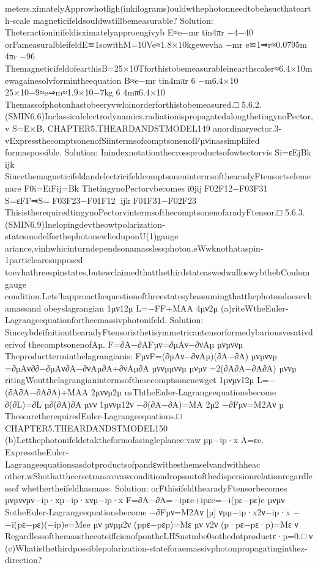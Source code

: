 {{{{{{{{{{meters.ximatelyApprowhotligh(inkilograms)ouldwthephotonneedtobehsucthatearth-scale
magneticifeldsouldwstillbemeasurable?
Solution:
Theteractioninifeldisximatelyapproengivyb
E≈e−mr
tin4πr
−4−40
orFameasuralbleifeldE≊1sowithM=10Ve≈1.8×10kgewevha
−mr
e≊1⇒r≈0.0795m
4πr
−96
ThemagneticifeldofearthisB=25×10Tforthistobemeasurableinearthscaler≈6.4×10m
ewagainesolvformintheequation
B≈e−mr
tin4mπr
6
−m6.4×10
25×10−9≈e⇒m≈1.9×10−7kg
6
4mπ6.4×10
Themassofphotonhastobeeryvwloinorderforthistobemeasured.□
5.6.2.(SMIN6.6)Inclassicalelectrodynamics,radiationispropagatedalongthetingynoPector,v
S=E×B,
CHAPTER5.THEARDANDSTMODEL149
anordinaryector.3-vExpressthecomptsonenofSiintermsofcomptsonenofFµνinassimpliifed
formaspossible.
Solution:
Inindexnotationthecrossproductsofowtectorvis
Si=εEjBk
ijk
SincethemagneticifeldandelectricifeldcomptsonenintermsofthearadyFtensortselemenare
F0i=EiFij=Bk
ThetingynoPectorvbecomes
i0jijF02F12−F03F31
S=εFF⇒S=F03F23−F01F12
ijk
F01F31−F02F23
ThisistherequiredtingynoPectorvintermsofthecomptsonenofaradyFtensor.□
5.6.3.(SMIN6.9)Inelopingdevtheowtpolarization-statesmodelforthephotonewlieduponU(1)gauge
ariance,vinhwhicinturndependsonamasslessphoton.eWwknothataspin-1particlearesupposed
toevhathreespinstates,butewclaimedthatthethirdstateaswedwalloswybthebCoulomgauge
condition.Lets’happroacthequestionofthreestatesybassumingthatthephotondoesevhamassand
obeyslagrangian
1µν12µ
L=−FF+MAA
4µν2µ
(a)riteWtheEuler-Lagrangeequationfortheemassivphotonifeld.
Solution:
SinceybdeifnitionthearadyFtensoristhetisymmetricantensorformedybariousvesativderivof
thecomptsonenofAµ.
F=∂A−∂AFµν=∂µAν−∂νAµ
µνµννµ
Theproductterminthelagrangianis:
FµνF=(∂µAν−∂νAµ)(∂A−∂A)
µνµννµ
=∂µAν∂∂−∂µAν∂A−∂νAµ∂A+∂νAµ∂A
µννµµννµ
µνµν
=2(∂A∂A−∂A∂A)
µννµ
ritingWoutthelagrangianintermsofthesecomptsonenewget
1µνµν12µ
L=−(∂A∂A−∂A∂A)+MAA
2µννµ2µ
usThtheEuler-Lagrangeequationsbecome
∂(∂L)=∂L
µ∂(∂A)∂A
µνν
1µννµ12ν
−∂(∂A−∂A)=MA
2µ2
−∂Fµν=M2Aν
µ
ThesearetherequiredEuler-Lagrangeequations.□
CHAPTER5.THEARDANDSTMODEL150
(b)Letthephotonifeldetaktheformofasingleplanee:vaw
µµ−ip·x
A=εe.
ExpresstheEuler-Lagrangeequationsasdotproductsofpandεwithesthemselvandwithheac
other.wShothattheersetransvevawconditiondropsoutofthedispersionrelationregardlessof
whethertheifeldhasmass.
Solution:
orFthisifeldthearadyFtensorbecomes
µνµννµν−ip·xµ−ip·xνµ−ip·x
F=∂A−∂A=−ipεe+ipεe=−i(pε−pε)e
µνµν
SotheEuler-Lagrangeequationsbecome
−∂Fµν=M2Aν
[µ]
νµµ−ip·x2ν−ip·x
−−i(pε−pε)(−ip)e=Mee
µν
µνµµ2ν
(ppε−pεp)=Mε
µν
ν2ν
(p·pε−pε·p)=Mε
ν
RegardlessofthemassthecoteiffcienofpontheLHSustmbe0sothedotproductε·p=0.□
ν
(c)Whatisthethirdpossiblepolarization-stateforaemassivphotonpropagatinginthez-direction?
}}}}}}}}}}
